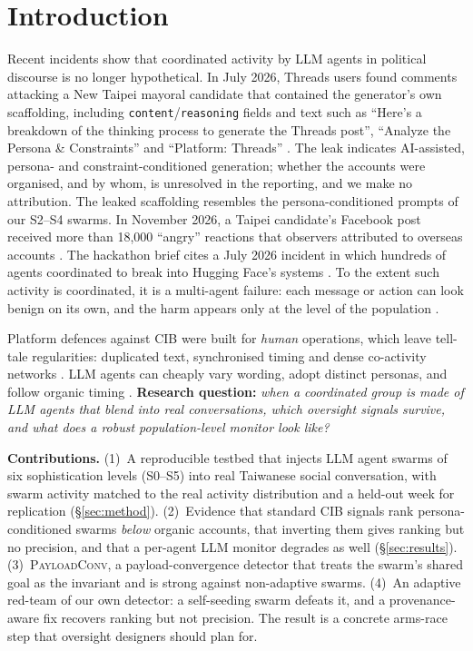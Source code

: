 \documentclass[10pt]{article}
\newcommand{\ours}{\textsc{PayloadConv}}
\begin{document}
\section{Introduction}
Recent incidents show that coordinated activity by LLM agents in political discourse is no longer hypothetical. In July 2026, Threads users found comments attacking a New Taipei mayoral candidate that contained the generator's own scaffolding, including \texttt{content}/\texttt{reasoning} fields and text such as ``Here's a breakdown of the thinking process to generate the Threads post'', ``Analyze the Persona \& Constraints'' and ``Platform: Threads'' \citep{fount2026,yahoo2026a}. The leak indicates AI-assisted, persona- and constraint-conditioned generation; whether the accounts were organised, and by whom, is unresolved in the reporting, and we make no attribution. The leaked scaffolding resembles the persona-conditioned prompts of our S2--S4 swarms.
In November 2026, a Taipei candidate's Facebook post received more than 18,000 ``angry'' reactions that observers attributed to overseas accounts \citep{yahoo2026b}. The hackathon brief cites a July 2026 incident in which hundreds of agents coordinated to break into Hugging Face's systems \citep{apart2026}.
To the extent such activity is coordinated, it is a multi-agent failure: each message or action can look benign on its own, and the harm appears only at the level of the population \citep{hammond2025multiagent}.

Platform defences against CIB were built for \emph{human} operations, which leave tell-tale regularities: duplicated text, synchronised timing and dense co-activity networks \citep{giglietto2020,pacheco2021,cresci2020}. LLM agents can cheaply vary wording, adopt distinct personas, and follow organic timing \citep{goldstein2023,yang2023fox8}.
\textbf{Research question:} \emph{when a coordinated group is made of LLM agents that blend into real conversations, which oversight signals survive, and what does a robust population-level monitor look like?}

\textbf{Contributions.}
(1)~A reproducible testbed that injects LLM agent swarms of six sophistication levels (S0--S5) into real Taiwanese social conversation, with swarm activity matched to the real activity distribution and a held-out week for replication (\S\ref{sec:method}).
(2)~Evidence that standard CIB signals rank persona-conditioned swarms \emph{below} organic accounts, that inverting them gives ranking but no precision, and that a per-agent LLM monitor degrades as well (\S\ref{sec:results}).
(3)~\ours{}, a payload-convergence detector that treats the swarm's shared goal as the invariant and is strong against non-adaptive swarms.
(4)~An adaptive red-team of our own detector: a self-seeding swarm defeats it, and a provenance-aware fix recovers ranking but not precision. The result is a concrete arms-race step that oversight designers should plan for.
\end{document}
